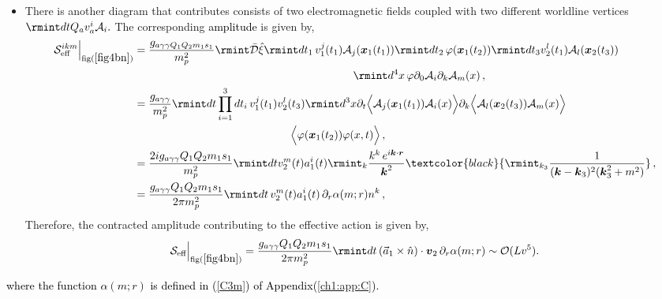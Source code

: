\begin{itemize}
\item  There is another diagram that contributes  consists of two electromagnetic fields coupled with two different worldline vertices  $\rmint dt Q_a v^{i}_{a}\mathcal{A}_{i}.$ The corresponding \textcolor{black}{amplitude} is given by,
\begin{align}
    \begin{split}
\mathcal{S}_{\text{eff}}^{ikm}\Big |_{\text{fig}(\ref{fig4bn})}&=\frac{g_{a\gamma\gamma Q_1Q_2m_1s_1}}{m_p^2}{\rmint\Bar{\mathcal{D}}\Hat{\xi}\rmint dt_1\,v_1^{j}(t_1) \mathcal{A}_{j}(\boldsymbol{x}_1(t_1))\rmint dt_2\,\varphi(\boldsymbol{x}_1(t_2))\rmint dt_3 v_2^{l}(t_1)\mathcal{A}_{l}(\boldsymbol{x}_2(t_3))}\\ & \hspace{7 cm}
\rmint d^4x \,\varphi \partial_{0}  \mathcal{A}_{i}\partial_{k}\mathcal{A}_{m}(x)\,,\\ &
        =\frac{g_{a\gamma\gamma}}{m_p^2}\rmint dt\prod_{i=1}^{3}dt_{i}\,v_1^{j}(t_1)v_2^{l}(t_3)\rmint d^3x \partial_{t}\Big\langle \mathcal{A}_{j}(\boldsymbol{x}_1(t_1))\mathcal{A}_{i}(x)\Big\rangle\partial_{k}\Big\langle \mathcal{A}_{l}(\boldsymbol{x}_2(t_3))\mathcal{A}_{m}(x)\Big\rangle \\& \hspace{5cm} \Big\langle\varphi(\boldsymbol{x}_1(t_2))\varphi(x,t)\Big\rangle\,,\\ &
        =\frac{2ig_{a\gamma\gamma}Q_1Q_2m_1s_1}{m_p^2}\rmint dt v_2^{m}(t)a_1^{i}(t)\rmint_{k}\frac{k^k\,e^{i\boldsymbol{k}\cdot\boldsymbol{r}}}{\boldsymbol{k}^2}\textcolor{black}{\rmint_{k_3}\frac{1}{(\boldsymbol{k}-\boldsymbol{k}_3)^2(\boldsymbol{k}_3^2+m^2)}}\,,\\ &
  =\frac{ g_{a\gamma\gamma}Q_1Q_2m_1s_1}{2\pi m_p^2}\rmint dt \, v_2^m (t)a_1^i(t)\,\partial_r\alpha(m;r)n^k\,,\label{4.33mm}
    \end{split}
\end{align}
Therefore, the contracted amplitude contributing to the effective action is given by,
\begin{align}
    \begin{split}
        \mathcal{S}_{\text{eff}}\Big|_{\text{fig}(\ref{fig4bn})}=\frac{ g_{a\gamma\gamma}Q_1Q_2m_1s_1}{2\pi m_p^2}\rmint dt \,(\Vec{a}_1 \times \Hat{n})\cdot \boldsymbol{v}_2\, \partial_{r}\alpha(m;r)\sim \mathcal{O}(Lv^5).
    \end{split}
\end{align}
\end{itemize}
\textcolor{black}{where the function $\alpha(m;r)$ is defined in (\ref{C3m}) of Appendix(\ref{ch1:app:C}).}
